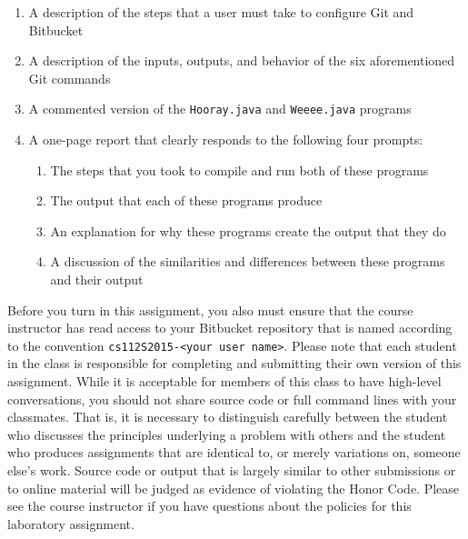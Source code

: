   \vspace*{-.05in}
  \begin{enumerate}
  \itemsep 0em
    \item A description of the steps that a user must take to configure Git and Bitbucket
    \item A description of the inputs, outputs, and behavior of the six aforementioned Git commands
    \item A commented version of the {\tt Hooray.java} and {\tt Weeee.java} programs
    \item A one-page report that clearly responds to the following four prompts:

      \vspace*{-.05in}
      \begin{enumerate}

        \item The steps that you took to compile and run both of these programs

        \item The output that each of these programs produce

        \item An explanation for why these programs create the output that they do

        \item A discussion of the similarities and differences between these programs and their output

      \end{enumerate}

  \end{enumerate}

Before you turn in this assignment, you also must ensure that the course instructor has read access to your Bitbucket
repository that is named according to the convention {\tt cs112S2015-<your user name>}. Please note that each student in
the class is responsible for completing and submitting their own version of this assignment. While it is acceptable for
members of this class to have high-level conversations, you should not share source code or full command lines with your
classmates.  That is, it is necessary to distinguish carefully between the student who discusses the principles
underlying a problem with others and the student who produces assignments that are identical to, or merely variations
on, someone else's work.  Source code or output that is largely similar to other submissions or to online material will
be judged as evidence of violating the Honor Code. Please see the course instructor if you have questions about the policies
for this laboratory assignment.


